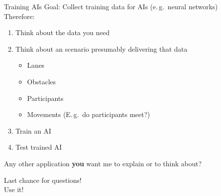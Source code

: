 \documentclass[aspectratio=169]{beamer}
\begin{document}
\begin{frame}{Training AIs}
    Goal: Collect training data for AIs (e.\,g.\ neural networks)\\
    Therefore:
    \begin{enumerate}[<+(1)->] %
        \item Think about the data you need
        \item Think about an scenario presumably delivering that data
            \begin{itemize}
                \item Lanes
                \item Obstacles
                \item Participants
                \item Movements (E.\,g.\ do participants meet?)
            \end{itemize}
        \item Train an AI
        \item Test trained AI
    \end{enumerate}
\end{frame}

\begin{frame}[plain]
    \centering
    \Huge Any other application {\bfseries you} want me to explain or to think about?
\end{frame}

\begin{frame}[plain]
    \centering
    \Huge Last chance for questions!\\
    \huge Use it!
\end{frame}
\end{document}
